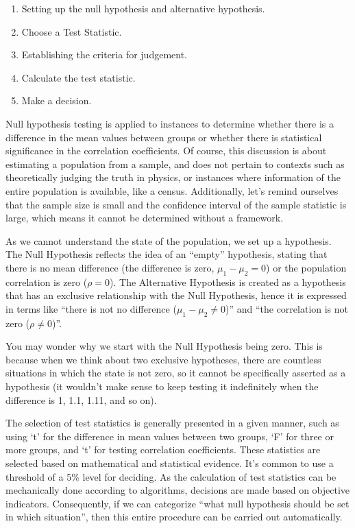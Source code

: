 \documentclass[
  a4paper,
]{book}
\providecommand{\tightlist}{%
  \setlength{\itemsep}{0pt}\setlength{\parskip}{0pt}}\usepackage{longtable,booktabs,array}
\begin{document}
\begin{enumerate}
\def\labelenumi{\arabic{enumi}.}
\tightlist
\item
  Setting up the null hypothesis and alternative hypothesis.
\item
  Choose a Test Statistic.
\item
  Establishing the criteria for judgement.
\item
  Calculate the test statistic.
\item
  Make a decision.
\end{enumerate}

Null hypothesis testing is applied to instances to determine whether
there is a difference in the mean values between groups or whether there
is statistical significance in the correlation coefficients. Of course,
this discussion is about estimating a population from a sample, and does
not pertain to contexts such as theoretically judging the truth in
physics, or instances where information of the entire population is
available, like a census. Additionally, let's remind ourselves that the
sample size is small and the confidence interval of the sample statistic
is large, which means it cannot be determined without a framework.

As we cannot understand the state of the population, we set up a
hypothesis. The Null Hypothesis reflects the idea of an ``empty''
hypothesis, stating that there is no mean difference (the difference is
zero, \(\mu_1 - \mu_2 = 0\)) or the population correlation is zero
(\(\rho = 0\)). The Alternative Hypothesis is created as a hypothesis
that has an exclusive relationship with the Null Hypothesis, hence it is
expressed in terms like ``there is not no difference
(\(\mu_1 - \mu_2 \neq 0\))'' and ``the correlation is not zero
(\(\rho \neq 0\))''.

You may wonder why we start with the Null Hypothesis being zero. This is
because when we think about two exclusive hypotheses, there are
countless situations in which the state is not zero, so it cannot be
specifically asserted as a hypothesis (it wouldn't make sense to keep
testing it indefinitely when the difference is 1, 1.1, 1.11, and so on).

The selection of test statistics is generally presented in a given
manner, such as using `t' for the difference in mean values between two
groups, `F' for three or more groups, and `t' for testing correlation
coefficients. These statistics are selected based on mathematical and
statistical evidence. It's common to use a threshold of a 5\% level for
deciding. As the calculation of test statistics can be mechanically done
according to algorithms, decisions are made based on objective
indicators. Consequently, if we can categorize ``what null hypothesis
should be set in which situation'', then this entire procedure can be
carried out automatically.
\end{document}
